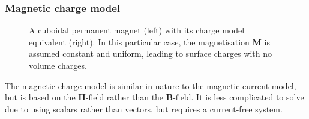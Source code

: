 \subsubsection{Magnetic charge model}
\begin{figure}
    \centering
    \hfill
    \begin{subfigure}{0.4\textwidth}
        
    \end{subfigure} \hfill
    \begin{subfigure}{0.4\textwidth}
        
    \end{subfigure}
    \hfill
    \caption{A cuboidal permanent magnet (left) with its charge model equivalent (right). In this particular case, the magnetisation \(\mathbf{M}\) is assumed constant and uniform, leading to surface charges with no volume charges.}
    \label{fig:chargeModelSchematic}
\end{figure}
The magnetic charge model is similar in nature to the magnetic current model, but is based on the \(\mathbf{H}\)-field rather than the \(\mathbf{B}\)-field. It is less complicated to solve due to using scalars rather than vectors, but requires a current-free system.

